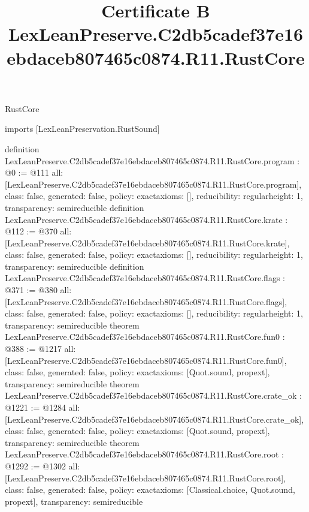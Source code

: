 \begin{lexlean}{RustCore}
\title{Certificate B LexLeanPreserve.C2db5cadef37e16ebdaceb807465c0874.R11.RustCore}
\begin{coremodule}
imports [LexLeanPreservation.RustSound]

definition LexLeanPreserve.C2db5cadef37e16ebdaceb807465c0874.R11.RustCore.program : @0 := @111 {
  all: [LexLeanPreserve.C2db5cadef37e16ebdaceb807465c0874.R11.RustCore.program],
  class: false,
  generated: false,
  policy: exact{axioms: []},
  reducibility: regular{height: 1},
  transparency: semireducible
}
definition LexLeanPreserve.C2db5cadef37e16ebdaceb807465c0874.R11.RustCore.krate : @112 := @370 {
  all: [LexLeanPreserve.C2db5cadef37e16ebdaceb807465c0874.R11.RustCore.krate],
  class: false,
  generated: false,
  policy: exact{axioms: []},
  reducibility: regular{height: 1},
  transparency: semireducible
}
definition LexLeanPreserve.C2db5cadef37e16ebdaceb807465c0874.R11.RustCore.flags : @371 := @380 {
  all: [LexLeanPreserve.C2db5cadef37e16ebdaceb807465c0874.R11.RustCore.flags],
  class: false,
  generated: false,
  policy: exact{axioms: []},
  reducibility: regular{height: 1},
  transparency: semireducible
}
theorem LexLeanPreserve.C2db5cadef37e16ebdaceb807465c0874.R11.RustCore.fun0 : @388 := @1217 {
  all: [LexLeanPreserve.C2db5cadef37e16ebdaceb807465c0874.R11.RustCore.fun0],
  class: false,
  generated: false,
  policy: exact{axioms: [Quot.sound, propext]},
  transparency: semireducible
}
theorem LexLeanPreserve.C2db5cadef37e16ebdaceb807465c0874.R11.RustCore.crate_ok : @1221 := @1284 {
  all: [LexLeanPreserve.C2db5cadef37e16ebdaceb807465c0874.R11.RustCore.crate_ok],
  class: false,
  generated: false,
  policy: exact{axioms: [Quot.sound, propext]},
  transparency: semireducible
}
theorem LexLeanPreserve.C2db5cadef37e16ebdaceb807465c0874.R11.RustCore.root : @1292 := @1302 {
  all: [LexLeanPreserve.C2db5cadef37e16ebdaceb807465c0874.R11.RustCore.root],
  class: false,
  generated: false,
  policy: exact{axioms: [Classical.choice, Quot.sound, propext]},
  transparency: semireducible
}


\end{coremodule}
\end{lexlean}
